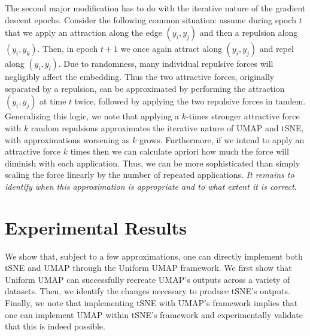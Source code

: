 \documentclass{article}
\theoremstyle{definition}
\begin{document}
\begin{multicols}{2}
The second major modification has to do with the iterative nature of the gradient descent epochs. Consider the following common situation: assume during
epoch $t$ that we apply an attraction along the edge $(y_i, y_j)$ and then a repulsion along $(y_i, y_k)$. Then, in epoch $t+1$ we once again attract along
$(y_i, y_j)$ and repel along $(y_i, y_l)$. Due to randomness, many individual repulsive forces will negligibly affect the embedding. Thus the two attractive forces,
originally separated by a repulsion, can be approximated by performing the attraction $(y_i, y_j)$ at time $t$ twice, followed by applying the two repulsive
forces in tandem. Generalizing this logic, we note that applying a $k$-times stronger attractive force with $k$ random repulsions approximates the iterative
nature of UMAP and tSNE, with approximations worsening as $k$ grows.
Furthermore, if we intend to apply an attractive force $k$ times then we can calculate apriori how much the force will diminish with each application. Thus, we can be
more sophisticated than simply scaling the force linearly by the number of repeated applications. \textit{It remains to identify when this approximation is appropriate
and to what extent it is correct}.

\section{Experimental Results} \label{results}
We show that, subject to a few approximations, one can directly implement both tSNE and UMAP through the Uniform UMAP framework. We first show that Uniform UMAP
can successfully recreate UMAP's outputs across a variety of datasets. Then, we identify the changes necessary to produce tSNE's outputs. Finally, we note that
implementing tSNE with UMAP's framework implies that one can implement UMAP within tSNE's framework and experimentally validate that this is indeed possible.


\end{multicols}
\end{document}
